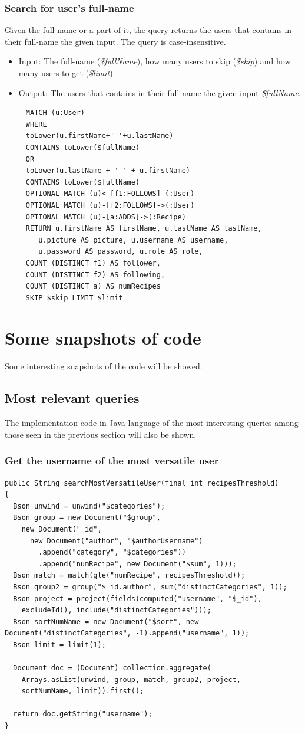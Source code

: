\documentclass[a4paper]{report}
\begin{document}
\subsubsection{Search for user's full-name}
Given the full-name or a part of it, the query returns the users that contains in their full-name the given input. The query is case-insensitive.
\begin{itemize}
	\item Input: The full-name (\emph{\$fullName}), how many users to skip (\emph{\$skip}) and how many users to get (\emph{\$limit}).
	\item Output: The users that contains in their full-name the given input \emph{\$fullName}.
\end{itemize}
\begin{lstlisting}
	 MATCH (u:User) 
	 WHERE
	 toLower(u.firstName+' '+u.lastName)
	 CONTAINS toLower($fullName)
	 OR
	 toLower(u.lastName + ' ' + u.firstName)
	 CONTAINS toLower($fullName)
	 OPTIONAL MATCH (u)<-[f1:FOLLOWS]-(:User)
	 OPTIONAL MATCH (u)-[f2:FOLLOWS]->(:User)
	 OPTIONAL MATCH (u)-[a:ADDS]->(:Recipe)
	 RETURN u.firstName AS firstName, u.lastName AS lastName,
	 	u.picture AS picture, u.username AS username,
	 	u.password AS password, u.role AS role,
	 COUNT (DISTINCT f1) AS follower,
	 COUNT (DISTINCT f2) AS following,
	 COUNT (DISTINCT a) AS numRecipes
	 SKIP $skip LIMIT $limit
\end{lstlisting} 

\section {Some snapshots of code}
Some interesting snapshots of the code will be showed.
\subsection{Most relevant queries}
The implementation code in Java language of the most interesting queries among those seen in the previous section will also be shown.
\subsubsection{Get the username of the most versatile user}
\lstset{language=code}
\begin{lstlisting}
public String searchMostVersatileUser(final int recipesThreshold)
{
  Bson unwind = unwind("$categories");
  Bson group = new Document("$group", 
    new Document("_id", 
      new Document("author", "$authorUsername")
        .append("category", "$categories"))
        .append("numRecipe", new Document("$sum", 1)));
  Bson match = match(gte("numRecipe", recipesThreshold));
  Bson group2 = group("$_id.author", sum("distinctCategories", 1));
  Bson project = project(fields(computed("username", "$_id"), 
    excludeId(), include("distinctCategories")));
  Bson sortNumName = new Document("$sort", new Document("distinctCategories", -1).append("username", 1));
  Bson limit = limit(1);

  Document doc = (Document) collection.aggregate(
    Arrays.asList(unwind, group, match, group2, project, 
    sortNumName, limit)).first();

  return doc.getString("username");
}	
\end{lstlisting} 
\end{document}

